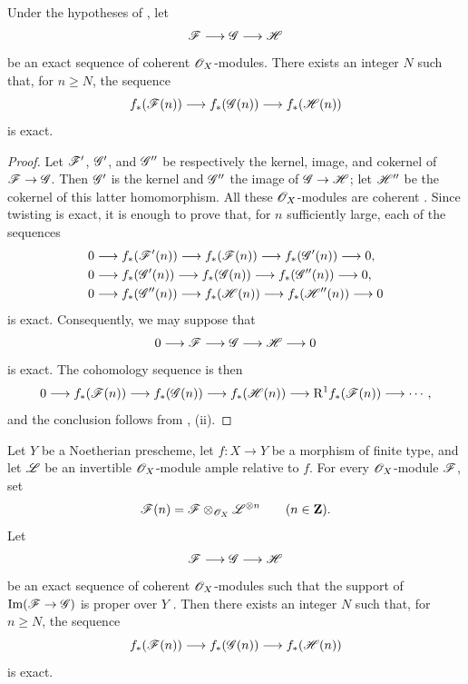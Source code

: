 \begin{corollary}[2.2.3]
\label{III.2.2.3}
Under the hypotheses of , let
\[
  \mathscr{F}\longrightarrow\mathscr{G}\longrightarrow\mathscr{H}
\]
be an exact sequence of coherent $\mathscr{O}_X$-modules.
There exists an integer $N$ such that, for $n\geq N$, the sequence
\[
  f_*(\mathscr{F}(n))
  \longrightarrow f_*(\mathscr{G}(n))
  \longrightarrow f_*(\mathscr{H}(n))
\]
is exact.
\end{corollary}

\begin{proof}
Let $\mathscr{F}'$, $\mathscr{G}'$, and $\mathscr{G}''$ be respectively the kernel, image, and cokernel of $\mathscr{F}\to\mathscr{G}$.
Then $\mathscr{G}'$ is the kernel and $\mathscr{G}''$ the image of $\mathscr{G}\to\mathscr{H}$; let $\mathscr{H}''$ be the cokernel of this latter homomorphism.
All these $\mathscr{O}_X$-modules are coherent .
Since twisting is exact, it is enough to prove that, for $n$ sufficiently large, each of the sequences
\begin{align*}
  0&\longrightarrow f_*(\mathscr{F}'(n))
    \longrightarrow f_*(\mathscr{F}(n))
    \longrightarrow f_*(\mathscr{G}'(n))
    \longrightarrow0,\\
  0&\longrightarrow f_*(\mathscr{G}'(n))
    \longrightarrow f_*(\mathscr{G}(n))
    \longrightarrow f_*(\mathscr{G}''(n))
    \longrightarrow0,\\
  0&\longrightarrow f_*(\mathscr{G}''(n))
    \longrightarrow f_*(\mathscr{H}(n))
    \longrightarrow f_*(\mathscr{H}''(n))
    \longrightarrow0
\end{align*}
is exact.
Consequently, we may suppose that
\[
  0\longrightarrow\mathscr{F}\longrightarrow\mathscr{G}
   \longrightarrow\mathscr{H}\longrightarrow0
\]
is exact.
The cohomology sequence is then
\[
  0\longrightarrow f_*(\mathscr{F}(n))
  \longrightarrow f_*(\mathscr{G}(n))
  \longrightarrow f_*(\mathscr{H}(n))
  \longrightarrow \mathrm{R}^1f_*(\mathscr{F}(n))
  \longrightarrow\cdots,
\]
and the conclusion follows from , (ii).
\end{proof}


\begin{corollary}[2.2.4]
\label{III.2.2.4}
Let $Y$ be a Noetherian prescheme, let $f:X\to Y$ be a morphism of finite type, and let $\mathscr{L}$ be an invertible $\mathscr{O}_X$-module ample relative to $f$.
For every $\mathscr{O}_X$-module $\mathscr{F}$, set
\[
  \mathscr{F}(n)=\mathscr{F}\otimes_{\mathscr{O}_X}\mathscr{L}^{\otimes n}
  \qquad(n\in\mathbf{Z}).
\]
Let
\[
  \mathscr{F}\longrightarrow\mathscr{G}\longrightarrow\mathscr{H}
\]
be an exact sequence of coherent $\mathscr{O}_X$-modules such that the support of $\operatorname{Im}(\mathscr{F}\to\mathscr{G})$ is proper over $Y$ .
Then there exists an integer $N$ such that, for $n\geq N$, the sequence
\[
  f_*(\mathscr{F}(n))
  \longrightarrow f_*(\mathscr{G}(n))
  \longrightarrow f_*(\mathscr{H}(n))
\]
is exact.
\end{corollary}

